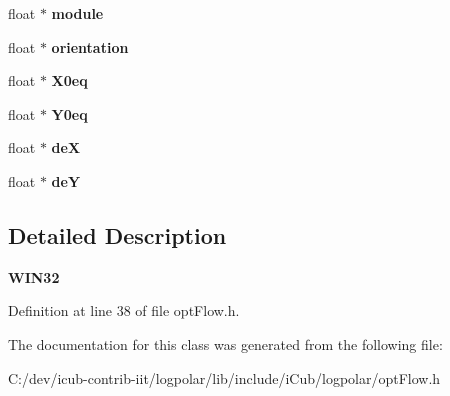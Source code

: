 \begin{DoxyCompactItemize}
\item 
float $\ast$ {\bfseries module}\label{classoFlow_a1f42ed2845a68c573927bacbe9c11b6a}

\item 
float $\ast$ {\bfseries orientation}\label{classoFlow_a1a98b939b1c63950b0281d674bfe3c24}

\item 
float $\ast$ {\bfseries X0eq}\label{classoFlow_ad2ea52999c7b77e62e6a142c3d1c6d3c}

\item 
float $\ast$ {\bfseries Y0eq}\label{classoFlow_a9d63563fb067472d035c3ec0e0470ad6}

\item 
float $\ast$ {\bfseries de\+X}\label{classoFlow_ac57911cd9c4f6b509e995d87d04bf069}

\item 
float $\ast$ {\bfseries de\+Y}\label{classoFlow_a075a97399a21cba84cb647864979cffc}

\end{DoxyCompactItemize}


\subsection{Detailed Description}
{\bfseries W\+I\+N32} 

Definition at line 38 of file opt\+Flow.\+h.



The documentation for this class was generated from the following file\+:\begin{DoxyCompactItemize}
\item 
C\+:/dev/icub-\/contrib-\/iit/logpolar/lib/include/i\+Cub/logpolar/opt\+Flow.\+h\end{DoxyCompactItemize}
